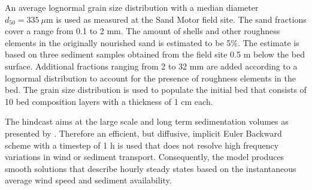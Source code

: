 An average lognormal grain size distribution with a median diameter
$d_{50} = 335 ~ \mu \mathrm{m}$ is used as measured at the Sand Motor
field site. The sand fractions cover a range from 0.1 to 2 mm. The
amount of shells and other roughness elements in the originally
nourished sand is estimated to be 5\%. The estimate is based on three
sediment samples obtained from the field site 0.5 m below the bed
surface. Additional fractions ranging from 2 to 32 mm are added
according to a lognormal distribution to account for the presence of
roughness elements in the bed. The grain size distribution is used to
populate the initial bed that consists of 10 bed composition layers
with a thickness of 1 cm each.

The hindcast aims at the large scale and long term sedimentation
volumes as presented by \citet{Hoonhout2017a}. Therefore an efficient,
but diffusive, implicit Euler Backward scheme with a timestep of 1 h
is used that does not resolve high frequency variations in wind or
sediment transport. Consequently, the model produces smooth solutions
that describe hourly steady states based on the instantaneous average
wind speed and sediment availability.

